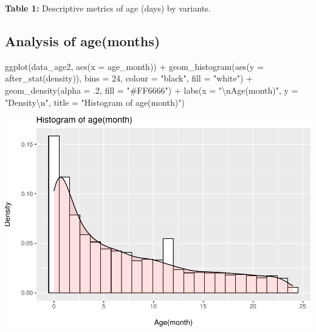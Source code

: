 \documentclass[
]{article}
\newenvironment{Shaded}{\begin{snugshade}}{\end{snugshade}}
\newcommand{\AttributeTok}[1]{\textcolor[rgb]{0.77,0.63,0.00}{#1}}
\newcommand{\DecValTok}[1]{\textcolor[rgb]{0.00,0.00,0.81}{#1}}
\newcommand{\FunctionTok}[1]{\textcolor[rgb]{0.00,0.00,0.00}{#1}}
\newcommand{\NormalTok}[1]{#1}
\newcommand{\SpecialCharTok}[1]{\textcolor[rgb]{0.00,0.00,0.00}{#1}}
\newcommand{\StringTok}[1]{\textcolor[rgb]{0.31,0.60,0.02}{#1}}
\renewenvironment{Shaded}{\begin{mdframed}[ backgroundcolor=shadecolor, linecolor = shadecolor, leftmargin=\dimexpr\leftmargin-2pt\relax, innerleftmargin=1.6pt, innertopmargin=5pt, skipabove=10pt,skipbelow=3pt ]}{\end{mdframed}}
\begin{document}
\textbf{Table 1:} Descriptive metrics of age (days) by variants.

\hypertarget{analysis-of-agemonths}{%
\subsection{Analysis of age(months)}\label{analysis-of-agemonths}}

\begin{Shaded}
\begin{Highlighting}[]
\FunctionTok{ggplot}\NormalTok{(data\_age2, }\FunctionTok{aes}\NormalTok{(}\AttributeTok{x =}\NormalTok{ age\_month)) }\SpecialCharTok{+} 
  \FunctionTok{geom\_histogram}\NormalTok{(}\FunctionTok{aes}\NormalTok{(}\AttributeTok{y =} \FunctionTok{after\_stat}\NormalTok{(density)), }
                 \AttributeTok{bins =} \DecValTok{24}\NormalTok{,}
                 \AttributeTok{colour =} \StringTok{"black"}\NormalTok{,}
                 \AttributeTok{fill =} \StringTok{"white"}\NormalTok{) }\SpecialCharTok{+}
  \FunctionTok{geom\_density}\NormalTok{(}\AttributeTok{alpha =}\NormalTok{ .}\DecValTok{2}\NormalTok{, }\AttributeTok{fill =} \StringTok{"\#FF6666"}\NormalTok{) }\SpecialCharTok{+}
  \FunctionTok{labs}\NormalTok{(}\AttributeTok{x =} \StringTok{"}\SpecialCharTok{\textbackslash{}n}\StringTok{Age(month)"}\NormalTok{,}
       \AttributeTok{y =} \StringTok{"Density}\SpecialCharTok{\textbackslash{}n}\StringTok{"}\NormalTok{,}
       \AttributeTok{title =} \StringTok{"Histogram of age(month)"}\NormalTok{)}
\end{Highlighting}
\end{Shaded}

\includegraphics{age_analysis_files/figure-latex/unnamed-chunk-7-1.pdf}
\end{document}
